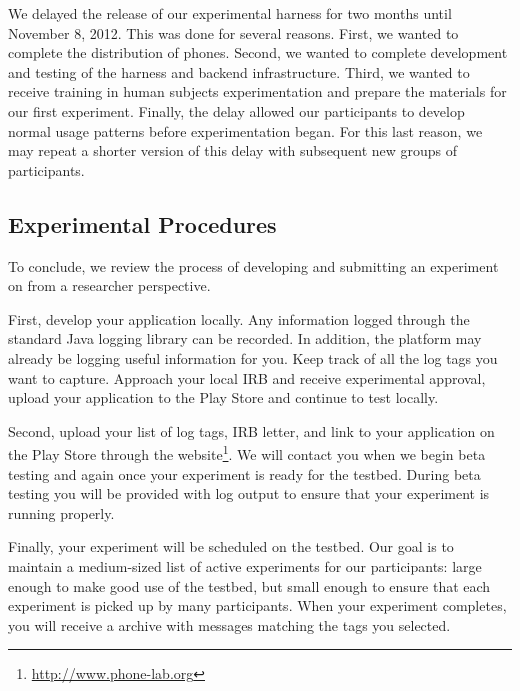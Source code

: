 We delayed the release of our experimental harness for two months until
November 8, 2012. This was done for several reasons. First, we wanted to
complete the distribution of phones. Second, we wanted to complete development
and testing of the harness and backend infrastructure. Third, we wanted to
receive training in human subjects experimentation and prepare the materials for
our first experiment. Finally, the delay allowed our participants to develop
normal usage patterns before experimentation began. For this last reason, we may
repeat a shorter version of this delay with subsequent new groups of \PhoneLab{}
participants.

\subsection{Experimental Procedures}

To conclude, we review the process of developing and submitting an experiment
on \PhoneLab{} from a researcher perspective.

First, develop your application locally. Any information logged through the
standard Java logging library can be recorded. In addition, the platform may
already be logging useful information for you. Keep track of all the log tags
you want \PhoneLab{} to capture. Approach your local IRB and receive
experimental approval, upload your application to the Play Store and continue
to test locally.

Second, upload your list of log tags, IRB letter, and link to your
application on the Play Store through the \PhoneLab{}
website\footnote{\url{http://www.phone-lab.org}}. We will contact you when we
begin beta testing and again once your experiment is ready for the testbed.
During beta testing you will be provided with \PhoneLab{} log output to ensure
that your experiment is running properly.

Finally, your experiment will be scheduled on the testbed. Our goal is to
maintain a medium-sized list of active experiments for our participants:
large enough to make good use of the testbed, but small enough to ensure that
each experiment is picked up by many participants. When your experiment
completes, you will receive a archive with messages matching the tags you
selected.
